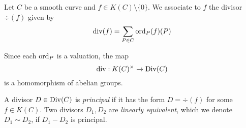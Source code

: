 \begin{definition}
	Let $C$ be a smooth curve and $f \in K(C)\setminus\{0\}$. We
	associate to $f$ the divisor $\div(f)$ given by
	\begin{equation*}
		\operatorname{div}(f) = \sum_{P \in C}\operatorname{ord}_P(f)(P)
	\end{equation*}
\end{definition}

\begin{remark}
	Since each $\operatorname{ord}_P$ is a valuation, the map
	\begin{equation*}
		\operatorname{div}: K(C)^\times \to \operatorname{Div}(C)
	\end{equation*}
	is a homomorphism of abelian groups.
\end{remark}

\begin{definition}
	A divisor $D \in \operatorname{Div}(C)$ is \emph{principal} if it has the form
	$D = \div(f)$ for some $f \in K(C)$.
	Two divisors $D_1, D_2$ are \emph{linearly equivalent}, which we denote
	$D_1 \sim D_2$, if $D_1 - D_2$ is principal.
\end{definition}

